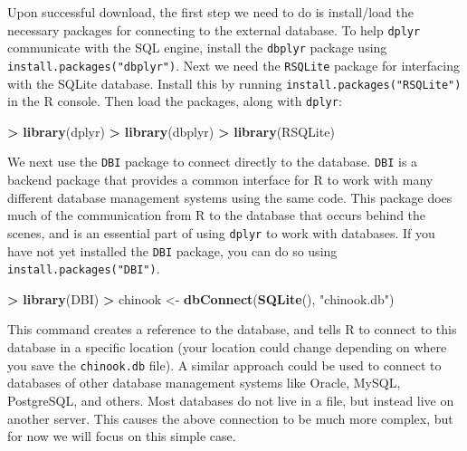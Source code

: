 \documentclass[
]{krantz}
\makeatletter
\newenvironment{Shaded}{\begin{snugshade}}{\end{snugshade}}
\newcommand{\KeywordTok}[1]{\textcolor[rgb]{0.27,0.27,0.27}{\textbf{#1}}}
\newcommand{\NormalTok}[1]{#1}
\newcommand{\OperatorTok}[1]{\textcolor[rgb]{0.43,0.43,0.43}{\textbf{#1}}}
\newcommand{\StringTok}[1]{\textcolor[rgb]{0.5,0.5,0.5}{#1}}
\newenvironment{kframe}{%
\medskip{}
\setlength{\fboxsep}{.8em}
 \def\at@end@of@kframe{}%
 \ifinner\ifhmode%
  \def\at@end@of@kframe{\end{minipage}}%
  \begin{minipage}{\columnwidth}%
 \fi\fi%
 \def\FrameCommand##1{\hskip\@totalleftmargin \hskip-\fboxsep
 \colorbox{shadecolor}{##1}\hskip-\fboxsep
     \hskip-\linewidth \hskip-\@totalleftmargin \hskip\columnwidth}%
 \MakeFramed {\advance\hsize-\width
   \@totalleftmargin\z@ \linewidth\hsize
   \@setminipage}}%
 {\par\unskip\endMakeFramed%
 \at@end@of@kframe}
\renewenvironment{Shaded}{\begin{kframe}}{\end{kframe}}
\makeatother
\begin{document}
Upon successful download, the first step we need to do is install/load the necessary packages for connecting to the external database. To help \texttt{dplyr} communicate with the SQL engine, install the \texttt{dbplyr} package using \texttt{install.packages("dbplyr")}. Next we need the \texttt{RSQLite} package for interfacing with the SQLite database. Install this by running \texttt{install.packages("RSQLite")} in the R console. Then load the packages, along with \texttt{dplyr}:

\begin{Shaded}
\begin{Highlighting}[]
\OperatorTok{\textgreater{}}\StringTok{ }\KeywordTok{library}\NormalTok{(dplyr)}
\OperatorTok{\textgreater{}}\StringTok{ }\KeywordTok{library}\NormalTok{(dbplyr)}
\OperatorTok{\textgreater{}}\StringTok{ }\KeywordTok{library}\NormalTok{(RSQLite)}
\end{Highlighting}
\end{Shaded}

We next use the \texttt{DBI} package to connect directly to the database. \texttt{DBI} is a backend package that provides a common interface for R to work with many different database management systems using the same code. This package does much of the communication from R to the database that occurs behind the scenes, and is an essential part of using \texttt{dplyr} to work with databases. If you have not yet installed the \texttt{DBI} package, you can do so using \texttt{install.packages("DBI")}.

\begin{Shaded}
\begin{Highlighting}[]
\OperatorTok{\textgreater{}}\StringTok{ }\KeywordTok{library}\NormalTok{(DBI)}
\OperatorTok{\textgreater{}}\StringTok{ }\NormalTok{chinook \textless{}{-}}\StringTok{ }\KeywordTok{dbConnect}\NormalTok{(}\KeywordTok{SQLite}\NormalTok{(), }\StringTok{"chinook.db"}\NormalTok{)}
\end{Highlighting}
\end{Shaded}

This command creates a reference to the database, and tells R to connect to this database in a specific location (your location could change depending on where you save the \texttt{chinook.db} file). A similar approach could be used to connect to databases of other database management systems like Oracle, MySQL, PostgreSQL, and others. Most databases do not live in a file, but instead live on another server. This causes the above connection to be much more complex, but for now we will focus on this simple case.
\end{document}
